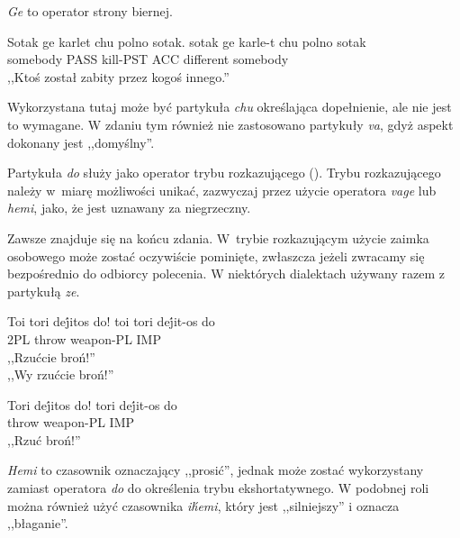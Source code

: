 \begin{spacing}{1.1}
\skipline

\emph{Ge} to operator strony biernej.

\begin{exe}
	\ex
	\trans Sotak ge karlet chu polno sotak.
	\gll  sotak ge karle-t chu polno sotak\\
	  somebody PASS kill-PST ACC different somebody\\
	\glt  ,,Ktoś został zabity przez kogoś innego.''
\end{exe}

Wykorzystana tutaj może być partykuła \emph{chu} określająca dopełnienie, ale
nie jest to wymagane. W zdaniu tym również nie zastosowano partykuły \emph{va},
gdyż aspekt dokonany jest ,,domyślny''.

Partykuła \emph{do} służy jako operator trybu rozkazującego (\Imp{}). Trybu
rozkazującego należy w~miarę możliwości unikać, zazwyczaj przez użycie operatora
\emph{vage} lub \emph{hemi}, jako, że jest uznawany za niegrzeczny.

Zawsze znajduje się na końcu zdania. W~trybie rozkazującym użycie zaimka
osobowego może zostać oczywiście pominięte, zwłaszcza jeżeli zwracamy się
bezpośrednio do odbiorcy polecenia. W niektórych dialektach używany razem z
partykułą \emph{ze}.

\begin{exe}
	\ex
	\trans Toi tori dej́itos do!
	\gll  toi tori dej́it-os do\\
	  2PL throw weapon-PL IMP\\
	\glt  ,,Rzućcie broń!'' \\ ,,Wy rzućcie broń!''
\end{exe}

\begin{exe}
	\ex
	\trans Tori dej́itos do!
	\gll  tori dej́it-os do\\
	  throw weapon-PL IMP\\
	\glt  ,,Rzuć broń!''
\end{exe}

\emph{Hemi} to czasownik oznaczający ,,prosić'', jednak może zostać wykorzystany
zamiast operatora \emph{do} do określenia trybu ekshortatywnego. W podobnej roli
można również użyć czasownika \emph{ih́emi}, który jest ,,silniejszy'' i oznacza
,,błaganie''.


\end{spacing}
